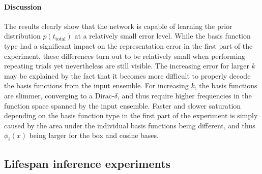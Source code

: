 \documentclass[a4paper,11pt]{article}
\begin{document}
\paragraph{Discussion}
The results clearly show that the network is capable of learning the prior distribution $p(t_\mathrm{total})$ at a relatively small error level. While the basis function type had a significant impact on the representation error in the first part of the experiment, these differences turn out to be relatively small when performing repeating trials yet nevertheless are still visible. The increasing error for larger $k$ may be explained by the fact that it becomes more difficult to properly decode the basis functions from the input ensemble. For increasing $k$, the basis functions are slimmer, converging to a Dirac-$\delta$, and thus require higher frequencies in the function space spanned by the input ensemble. Faster and slower saturation depending on the basis function type in the first part of the experiment is simply caused by the area under the individual basis functions being different, and thus $\phi_i(x)$ being larger for the box and cosine bases.

\subsection{Lifespan inference experiments}
\end{document}
